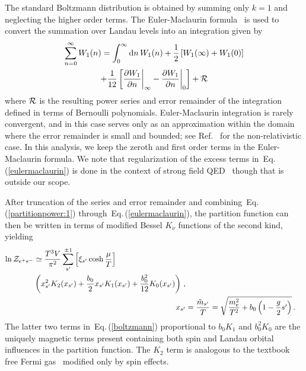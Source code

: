 \documentclass[aps,prd,floatfix,reprint]{revtex4-2}
\newcommand{\req}[1]{Eq.\,(\ref{#1})}
\begin{document}
The standard Boltzmann distribution is obtained by summing only $k=1$ and neglecting the higher order terms. The Euler-Maclaurin formula~\cite{abramowitz1988handbook} is used to convert the summation over Landau levels into an integration given by
\begin{multline}
 \label{eulermaclaurin}
 \sum_{n=0}^{\infty}W_{1}(n)=\int_{0}^{\infty}{\rm d}n\,W_{1}(n)+\frac{1}{2}\left[W_{1}(\infty)+W_{1}(0)\right]\\
 +\frac{1}{12}\left[\frac{\partial W_{1}}{\partial n}\bigg\vert_{\infty}-\frac{\partial W_{1}}{\partial n}\bigg\vert_{0}\right]+{\cal R}
\end{multline}
where ${\cal R}$ is the resulting power series and error remainder of the integration defined in terms of Bernoulli polynomials. Euler-Maclaurin integration is rarely convergent, and in this case serves only as an approximation within the domain where the error remainder is small and bounded; see Ref.~\cite{greiner2012thermodynamics} for the non-relativistic case. In this analysis, we keep the zeroth and first order terms in the Euler-Maclaurin formula. We note that regularization of the excess terms in~\req{eulermaclaurin} is done in the context of strong field QED~\cite{greiner2008quantum} though that is outside our scope.

After truncation of the series and error remainder and combining~\req{partitionpower:1} through~\req{eulermaclaurin}, the partition function can then be written in terms of modified Bessel $K_{\nu}$ functions of the second kind, yielding
\begin{align}
 \begin{split}
 \label{boltzmann}
 \ln{\cal Z}_{e^{+}e^{-}}&\simeq\frac{T^{3}V}{\pi^{2}}\sum_{s'}^{\pm1}\left[\xi_{s'}\cosh{\frac{\mu}{T}}\right]\\
 &\left(x_{s'}^{2}K_{2}(x_{s'})+\frac{b_{0}}{2}x_{s'}K_{1}(x_{s'})+\frac{b_{0}^{2}}{12}K_{0}(x_{s'})\right)\,,
 \end{split}\\
 \label{xfunc}
 x_{s'}&=\frac{{\tilde m}_{s'}}{T}=\sqrt{\frac{m_{e}^{2}}{T^{2}}+b_{0}\left(1-\frac{g}{2}s'\right)}\,.
\end{align}
The latter two terms in~\req{boltzmann} proportional to $b_{0}K_{1}$ and $b_{0}^{2}K_{0}$ are the uniquely magnetic terms present containing both spin and Landau orbital influences in the partition function. The $K_{2}$ term is analogous to the textbook free Fermi gas~\cite{greiner2012thermodynamics} modified only by spin effects.
\end{document}
